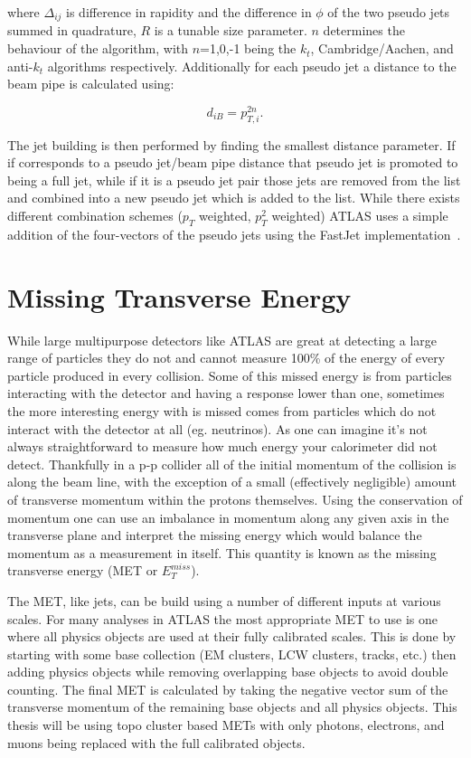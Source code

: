 where $\Delta_{ij}$ is difference in rapidity and the difference in $\phi$ of the two pseudo jets summed in quadrature, $R$ is a tunable size parameter.  
$n$ determines the behaviour of the algorithm, with $n$=1,0,-1 being the $k_t$, Cambridge/Aachen, and anti-$k_t$ algorithms respectively.  
Additionally for each pseudo jet a distance to the beam pipe is calculated using:

\begin{equation}
  d_{iB} = p_{T,i}^{2n}.
\end{equation}  

The jet building is then performed by finding the smallest distance parameter.  
If if corresponds to a pseudo jet/beam pipe distance that pseudo jet is promoted to being a full jet, while if it is a pseudo jet pair those jets are removed from the list and combined into a new pseudo jet which is added to the list.  
While there exists different combination schemes ($p_T$ weighted, $p_T^2$ weighted) ATLAS uses a simple addition of the four-vectors of the pseudo jets using the FastJet implementation~\cite{Cacciari:2011ma}.

\section{Missing Transverse Energy}

While large multipurpose detectors like ATLAS are great at detecting a large range of particles they do not and cannot measure 100\% of the energy of every particle produced in every collision.  
Some of this missed energy is from particles interacting with the detector and having a response lower than one, sometimes the more interesting energy with is missed comes from particles which do not interact with the detector at all (eg. neutrinos).  
As one can imagine it's not always straightforward to measure how much energy your calorimeter did not detect.  
Thankfully in a p-p collider all of the initial momentum of the collision is along the beam line, with the exception of a small (effectively negligible) amount of transverse momentum within the protons themselves.  
Using the conservation of momentum one can use an imbalance in momentum along any given axis in the transverse plane and interpret the missing energy which would balance the momentum as a measurement in itself.  
This quantity is known as the missing transverse energy (MET or $E_T^{miss}$).  

The MET, like jets, can be build using a number of different inputs at various scales.  
For many analyses in ATLAS the most appropriate MET to use is one where all physics objects are used at their fully calibrated scales.  
This is done by starting with some base collection (EM clusters, LCW clusters, tracks, etc.) then adding physics objects while removing overlapping base objects to avoid double counting.  
The final MET is calculated by taking the negative vector sum of the transverse momentum of the remaining base objects and all physics objects.  
This thesis will be using topo cluster based METs with only photons, electrons, and muons being replaced with the full calibrated objects.  




